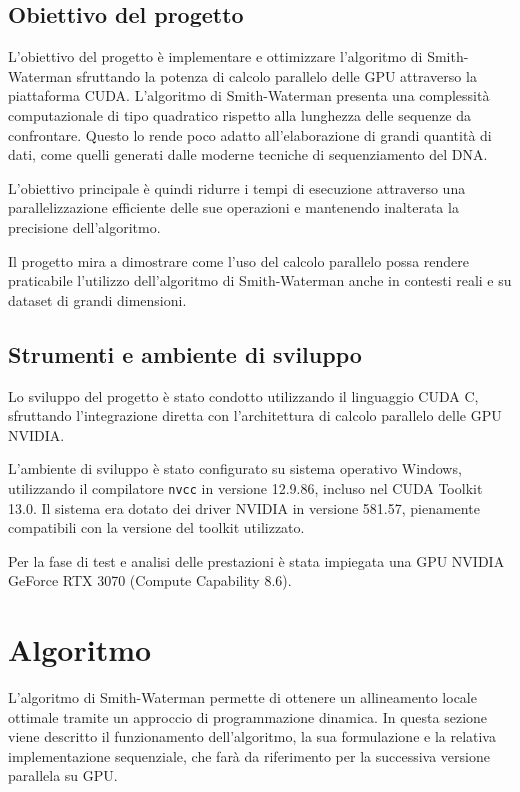 \documentclass[a4paper,12pt]{article}
\begin{document}
\subsection{Obiettivo del progetto}
L'obiettivo del progetto è implementare e ottimizzare l'algoritmo di Smith-Waterman sfruttando la potenza di calcolo parallelo delle GPU attraverso la piattaforma CUDA.
L'algoritmo di Smith-Waterman presenta una complessità computazionale di tipo quadratico rispetto alla lunghezza delle sequenze da confrontare.
Questo lo rende poco adatto all'elaborazione di grandi quantità di dati, come quelli generati dalle moderne tecniche di sequenziamento del DNA.

L'obiettivo principale è quindi ridurre i tempi di esecuzione attraverso una parallelizzazione efficiente delle sue operazioni e mantenendo inalterata la precisione dell'algoritmo.

Il progetto mira a dimostrare come l'uso del calcolo parallelo possa rendere praticabile l'utilizzo dell'algoritmo di Smith-Waterman anche in contesti reali e su dataset di grandi dimensioni.

\subsection{Strumenti e ambiente di sviluppo}
Lo sviluppo del progetto è stato condotto utilizzando il linguaggio CUDA C, sfruttando l'integrazione diretta con l'architettura di calcolo parallelo delle GPU NVIDIA.

L'ambiente di sviluppo è stato configurato su sistema operativo Windows, utilizzando il compilatore \texttt{nvcc} in versione 12.9.86, incluso nel CUDA Toolkit 13.0.
Il sistema era dotato dei driver NVIDIA in versione 581.57, pienamente compatibili con la versione del toolkit utilizzato.

Per la fase di test e analisi delle prestazioni è stata impiegata una GPU NVIDIA GeForce RTX 3070 (Compute Capability 8.6).

\section{Algoritmo}
L'algoritmo di Smith-Waterman permette di ottenere un allineamento locale ottimale tramite un approccio di programmazione dinamica.
In questa sezione viene descritto il funzionamento dell'algoritmo, la sua formulazione e la relativa implementazione sequenziale, che farà da riferimento per la successiva versione parallela su GPU.
\end{document}
